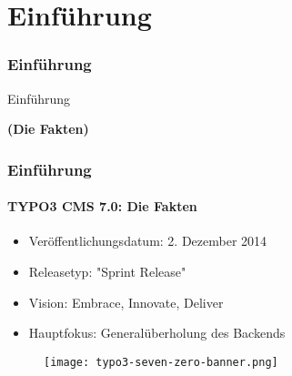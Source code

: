 %

\section{Einführung}
\begin{frame}[fragile]
	\frametitle{Einführung}

	\begin{center}\huge{Einführung}\end{center}
	\begin{center}\huge{\color{typo3darkgrey}\textbf{(Die Fakten)}}\end{center}

\end{frame}


\begin{frame}[fragile]
	\frametitle{Einführung}
	\framesubtitle{TYPO3 CMS 7.0: Die Fakten}

	\begin{itemize}
		\item Veröffentlichungsdatum: 2. Dezember 2014
		\item Releasetyp: "Sprint Release"
		\item Vision: Embrace, Innovate, Deliver
		\item Hauptfokus: Generalüberholung des Backends
	\end{itemize}

	\begin{figure}
		\texttt{[image: typo3-seven-zero-banner.png]}
	\end{figure}

\end{frame}

